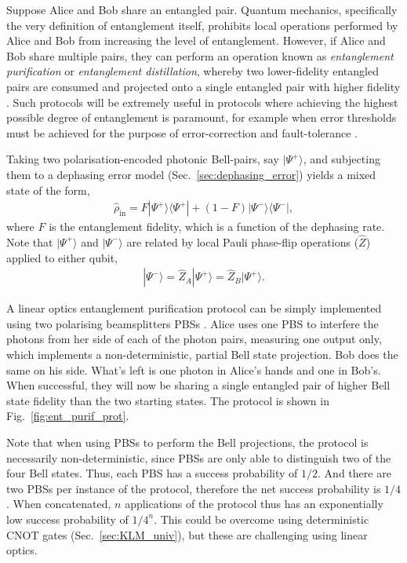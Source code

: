 \documentclass[aps,rmp,twocolumn,amsmath,amssymb,nofootinbib,superscriptaddress,longbibliography,floatfix,table-of-contents,eqsecnum]{revtex4-1}
\newcommand{\bra}[1]{\langle#1|}
\newcommand{\ket}[1]{|#1\rangle}
\begin{document}
Suppose Alice and Bob share an entangled pair. Quantum mechanics, specifically the very definition of entanglement itself, prohibits local operations performed by Alice and Bob from increasing the level of entanglement. However, if Alice and Bob share multiple pairs, they can perform an operation known as \textit{entanglement purification} or \textit{entanglement distillation}, whereby two lower-fidelity entangled pairs are consumed and projected onto a single entangled pair with higher fidelity \cite{bib:PRA_53_2046, bib:PRA_54_3824, bib:PRL_77_2818}. Such protocols will be extremely useful in protocols where achieving the highest possible degree of entanglement is paramount, for example when error thresholds must be achieved for the purpose of error-correction and fault-tolerance \cite{bib:NielsenChuang00}.

Taking two polarisation-encoded photonic Bell-pairs, say $\ket{\Psi^+}$, and subjecting them to a dephasing error model (Sec.~\ref{sec:dephasing_error}) yields a mixed state of the form,
\begin{align}
\hat\rho_\text{in} = F\ket{\Psi^+}\bra{\Psi^+} + (1-F)\ket{\Psi^-}\bra{\Psi^-},
\end{align}
where $F$ is the entanglement fidelity, which is a function of the dephasing rate. Note that $\ket{\Psi^+}$ and $\ket{\Psi^-}$ are related by local Pauli phase-flip operations ($\hat{Z}$) applied to either qubit,
\begin{align} \label{eq:psi_minus}
\ket{\Psi^-} = \hat{Z}_A \ket{\Psi^+} = \hat{Z}_B \ket{\Psi^+}.
\end{align}

A linear optics entanglement purification protocol can be simply implemented using two polarising beamsplitters PBSs \cite{bib:Pan01, bib:Pan03}. Alice uses one PBS to interfere the photons from her side of each of the photon pairs, measuring one output only, which implements a non-deterministic, partial Bell state projection. Bob does the same on his side. What's left is one photon in Alice's hands and one in Bob's. When successful, they will now be sharing a single entangled pair of higher Bell state fidelity than the two starting states. The protocol is shown in Fig.~\ref{fig:ent_purif_prot}.

Note that when using PBSs to perform the Bell projections, the protocol is necessarily non-deterministic, since PBSs are only able to distinguish two of the four Bell states. Thus, each PBS has a success probability of $1/2$. And there are two PBSs per instance of the protocol, therefore the net success probability is $1/4$. When concatenated, $n$ applications of the protocol thus has an exponentially low success probability of $1/4^n$. This could be overcome using deterministic CNOT gates (Sec.~\ref{sec:KLM_univ}), but these are challenging using linear optics.
\end{document}
